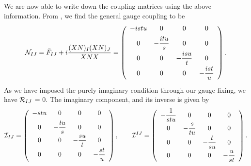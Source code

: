 We are now able to write down the coupling matrices using the above information. From , we find the general gauge coupling to be
\begin{equation}
  {\cal N}_{IJ} = \bar{F}_{IJ} + i \frac{(XN)_I (XN)_J}{XNX} =  \left(
\begin{array}{cccc}
 -i s t u & 0 & 0 & 0 \\[5pt]
 0 & -\dfrac{i t u}{s} & 0 & 0 \\[5pt]
 0 & 0 & -\dfrac{i s u}{t} & 0 \\[5pt]
 0 & 0 & 0 & -\dfrac{i s t}{u} \\[5pt]
\end{array}
\right).
\end{equation}
As we have imposed the purely imaginary condition through our gauge fixing, we have ${\cal R}_{IJ}$ = 0. The imaginary component, and its inverse is given by
\begin{equation}
\label{eq:iij}
    {\cal I}_{IJ} = \left(
\begin{array}{cccc}
 - s t u & 0 & 0 & 0 \\[5pt]
 0 & -\dfrac{ t u}{s} & 0 & 0 \\[5pt]
 0 & 0 & -\dfrac{s u}{t} & 0 \\[5pt]
 0 & 0 & 0 & -\dfrac{ s t}{u} \\[5pt]
\end{array}
\right), \qquad    {\cal I}^{IJ} = \left(
\begin{array}{cccc}
 -\dfrac{1}{s t u} & 0 & 0 & 0 \\[5pt]
 0 & -\dfrac{s}{t u} & 0 & 0 \\[5pt]
 0 & 0 & -\dfrac{t}{s u} & 0 \\[5pt]
 0 & 0 & 0 & -\dfrac{u}{s t} \\[5pt]
\end{array}
\right).
\end{equation}

